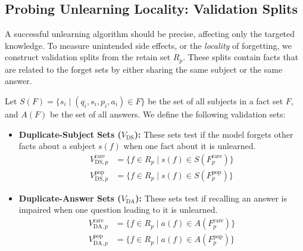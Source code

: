 \documentclass[11pt]{article}
\begin{document}
{\subsection{Probing Unlearning Locality: Validation Splits}
\label{subsec:duplicates_splits}

A successful unlearning algorithm should be precise, affecting only the targeted knowledge. To measure unintended side effects, or the \emph{locality} of forgetting, we construct validation splits from the retain set $R_p$. These splits contain facts that are related to the forget sets by either sharing the same subject or the same answer.

Let $S(F) = \{s_i \mid (q_i, s_i, p_i, a_i) \in F\}$ be the set of all subjects in a fact set $F$, and $A(F)$ be the set of all answers. We define the following validation sets:
\begin{itemize}
    \item \textbf{Duplicate-Subject Sets ($V_{\text{DS}}$):} These sets test if the model forgets other facts about a subject $s(f)$ when one fact about it is unlearned.
    \begin{align}
      V_{\text{DS}, p}^{\text{rare}} &= \{ f \in R_p \mid s(f) \in S(F_p^{\text{rare}}) \} \label{eq:vds-rare} \\
      V_{\text{DS}, p}^{\text{pop}}  &= \{ f \in R_p \mid s(f) \in S(F_p^{\text{pop}}) \} \label{eq:vds-pop}
    \end{align}
    
    \item \textbf{Duplicate-Answer Sets ($V_{\text{DA}}$):} These sets test if recalling an answer is impaired when one question leading to it is unlearned.
    \begin{align}
      V_{\text{DA}, p}^{\text{rare}} &= \{ f \in R_p \mid a(f) \in A(F_p^{\text{rare}}) \} \label{eq:vda-rare} \\
      V_{\text{DA}, p}^{\text{pop}}  &= \{ f \in R_p \mid a(f) \in A(F_p^{\text{pop}}) \} \label{eq:vda-pop}
    \end{align}
\end{itemize}



}
\end{document}
